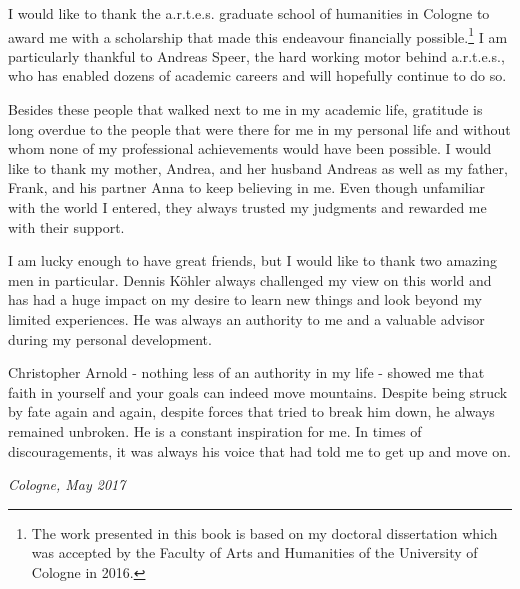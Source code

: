 I would like to thank the a.r.t.e.s. graduate school of humanities in Cologne to award me with a scholarship that made this endeavour financially possible.\footnote{The work presented in this book is based on my doctoral dissertation which was  accepted by the Faculty of Arts and Humanities of the University of Cologne in 2016.} I am particularly thankful to Andreas Speer, the hard working motor behind a.r.t.e.s., who has enabled dozens of academic careers and will hopefully continue to do so.

Besides these people that walked next to me in my academic life, gratitude is long overdue to the people that were there for me in my personal life and without whom none of my professional achievements would have been possible. I would like to thank my mother, Andrea, and her husband Andreas as well as my father, Frank, and his partner Anna to keep believing in me. Even though unfamiliar with the world I entered, they always trusted my judgments and rewarded me with their support. 

I am lucky enough to have great friends, but I would like to thank two amazing men in particular. Dennis Köhler always challenged my view on this world and has had a huge impact on my desire to learn new things and look beyond my limited experiences. He was always an authority to me and a valuable advisor during my personal development. 

Christopher Arnold - nothing less of an authority in my life - showed me that faith in yourself and your goals can indeed move mountains. Despite being struck by fate again and again, despite forces that tried to break him down, he always remained unbroken. He is a constant inspiration for me. In times of discouragements, it was always his voice that had told me to get up and move on. 

\begin{flushright}
\textit{Cologne, May 2017}
\end{flushright}